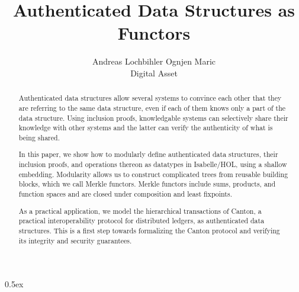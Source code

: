\documentclass[11pt,a4paper]{article}
\begin{document}
\title{Authenticated Data Structures as Functors}
\author{Andreas Lochbihler \qquad Ognjen Maric \\[1em] Digital Asset}

\maketitle

\begin{abstract}
  Authenticated data structures allow several systems to convince each other that they are referring to the same data structure,
  even if each of them knows only a part of the data structure.
  Using inclusion proofs, knowledgable systems can selectively share their knowledge with other systems
  and the latter can verify the authenticity of what is being shared.

  In this paper, we show how to modularly define authenticated data structures, their inclusion proofs, and operations thereon
  as datatypes in Isabelle/HOL, using a shallow embedding.
  Modularity allows us to construct complicated trees from reusable building blocks, which we call Merkle functors.
  Merkle functors include sums, products, and function spaces and are closed under composition and least fixpoints.

  As a practical application, we model the hierarchical transactions of Canton,
  a practical interoperability protocol for distributed ledgers, as authenticated data structures.
  This is a first step towards formalizing the Canton protocol and verifying its integrity and security guarantees.
\end{abstract}


\tableofcontents

\parindent 0pt\parskip 0.5ex



%
%
\end{document}
